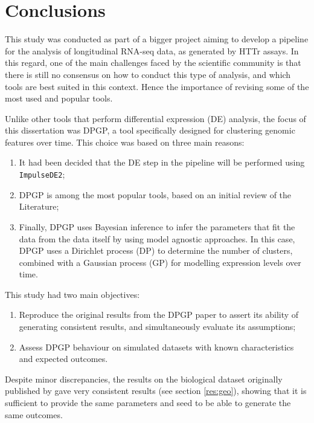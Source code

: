 \section{Conclusions}
This study was conducted as part of a bigger project aiming to develop a pipeline for the analysis of longitudinal RNA-seq data, as generated by HTTr assays. In this regard, one of the main challenges faced by the scientific community is that there is still no consensus on how to conduct this type of analysis, and which tools are best suited in this context. Hence the importance of revising some of the most used and popular tools.

Unlike other tools that perform differential expression (DE) analysis, the focus of this dissertation was DPGP, a tool specifically designed for clustering genomic features over time. This choice was based on three main reasons: 
\begin{enumerate}
    \item It had been decided that the DE step in the pipeline will be performed using \texttt{ImpulseDE2};
    \item DPGP is among the most popular tools, based on an initial review of the Literature;
    \item Finally, DPGP uses Bayesian inference to infer the parameters that fit the data from the data itself by using model agnostic approaches. In this case, DPGP uses a Dirichlet process (DP) to determine the number of clusters, combined with a Gaussian process (GP) for modelling expression levels over time.
\end{enumerate}

This study had two main objectives: 
\begin{enumerate}
    \item Reproduce the original results from the DPGP paper \citep{mcdowellClusteringGeneExpression2018} to assert its ability of generating consistent results, and simultaneously evaluate its assumptions;
    \item Assess DPGP behaviour on simulated datasets with known characteristics and expected outcomes.
\end{enumerate}

Despite minor discrepancies, the results on the biological dataset originally published by \citeauthor{sharmaRosRTranscriptionFactor2012} gave very consistent results (see section \ref{res:geo}), showing that it is sufficient to provide the same parameters and seed to be able to generate the same outcomes.

